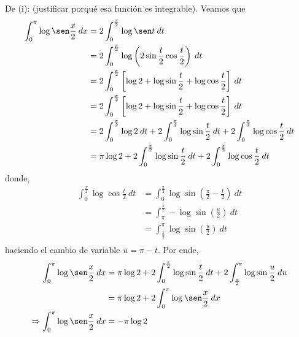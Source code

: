 \documentclass[12pt]{report}
\theoremstyle{largebreak}
\begin{document}
    \begin{sol}
        De (i): (justificar porqué esa función es integrable). Veamos que
        \begin{equation*}
            \begin{split}
                \int_0^\pi\log\sen\frac{x}{2}\:dx&=2\int_0^{\frac{\pi}{2}}\log\sen t\:dt\\
                &=2\int_0^{\frac{\pi}{2}}\log\left(2\sin
                \frac{t}{2}\cos\frac{t}{2}\right) \:dt\\
                &=2\int_0^{\frac{\pi}{2}}\left[\log2+\log\sin\frac{t}{2}+\log\cos\frac{t}{2} \right]  \:dt\\
                &=2\int_0^{\frac{\pi}{2}}\left[\log2+\log\sin\frac{t}{2}+\log\cos\frac{t}{2} \right]  \:dt\\
                &=2\int_0^{\frac{\pi}{2}}\log2\:dt+2\int_0^{\frac{\pi}{2}}\log\sin\frac{t}{2}\:dt+2\int_0^{\frac{\pi}{2}}\log\cos\frac{t}{2}\:dt\\
                &=\pi\log2+2\int_0^{\frac{\pi}{2}}\log\sin\frac{t}{2}\:dt+2\int_0^{\frac{\pi}{2}}\log\cos\frac{t}{2}\:dt\\
            \end{split}
        \end{equation*}
        donde,
        \begin{equation*}
            \begin{split}
                \int_0^{\frac{\pi}{2}}\log\cos\frac{t}{2}\:dt&=\int_0^{\frac{\pi}{2}}\log\sin\left(\frac{\pi}{2}-\frac{t}{2}\right) \:dt\\
                &=\int_{\pi}^{\frac{\pi}{2}}-\log\sin\left(\frac{u}{2}\right) \:dt\\
                &=\int_{\frac{\pi}{2}}^{\pi}\log\sin\left(\frac{u}{2}\right) \:dt\\
            \end{split}
        \end{equation*}
        haciendo el cambio de variable $u=\pi-t$. Por ende,
        \begin{equation*}
            \begin{split}
                \int_0^\pi\log\sen\frac{x}{2}\:dx&=\pi\log2+2\int_0^{\frac{\pi}{2}}\log\sin\frac{t}{2}\:dt+2\int_{\frac{\pi}{2}}^{\pi}\log\sin\frac{u}{2}\:du\\
                &=\pi\log2+2\int_0^{\pi}\log\sen\frac{x}{2}\:dx\\
                \Rightarrow \int_0^\pi\log\sen\frac{x}{2}\:dx&=-\pi\log2\\
            \end{split}
        \end{equation*}
        

\end{sol}
\end{document}
